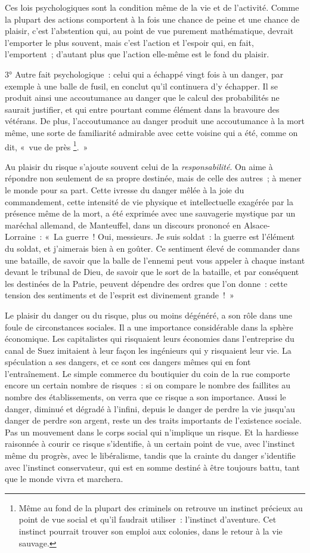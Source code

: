 \documentclass[french,twoside]{book} %
\begin{document}
Ces lois psychologiques sont la condition même de la vie et de l’activité. Comme la plupart des actions comportent à la fois une chance de peine et une chance de plaisir, c’est l’abstention qui, au point de vue purement mathématique, devrait l’emporter le plus souvent, mais c’est l’action et l’espoir qui, en fait, l’emportent ; d’autant plus que l’action elle-même est le fond du plaisir.\par
3° Autre fait psychologique : celui qui a échappé vingt fois à un danger, par exemple à une balle de fusil, en conclut qu’il continuera d’y échapper. Il se produit ainsi une accoutumance au danger que le calcul des probabilités ne saurait justifier, et qui entre pourtant comme élément dans la bravoure des vétérans. De plus, l’accoutumance au danger produit une accoutumance à la mort même, une sorte de familiarité admirable avec cette voisine qui a été, comme on dit, « vue de près \footnote{Même au fond de la plupart des criminels on retrouve un instinct précieux au point de vue social et qu’il faudrait utiliser : l’instinct d’aventure. Cet instinct pourrait trouver son emploi aux colonies, dans le retour à la vie sauvage.}. »\par
Au plaisir du risque s’ajoute souvent celui de la \emph{responsabilité}. On aime à répondre non seulement de sa propre destinée, mais de celle des autres ; à mener le monde pour sa part. Cette ivresse du danger mêlée à la joie du commandement, cette intensité de vie physique et intellectuelle exagérée par la présence même de la mort, a été exprimée avec une sauvagerie mystique par un maréchal allemand, de Manteuffel, dans un discours prononcé en Alsace-Lorraine : « La guerre ! Oui, messieurs. Je suis soldat : la guerre est l’élément du soldat, et j’aimerais bien à en goûter. Ce sentiment élevé de commander dans une bataille, de savoir que la balle de l’ennemi peut vous appeler à chaque instant devant le tribunal de Dieu, de savoir que le sort de la bataille, et par conséquent les destinées de la Patrie, peuvent dépendre des ordres que l’on donne : cette tension des sentiments et de l’esprit est divinement grande ! »\par
Le plaisir du danger ou du risque, plus ou moins dégénéré, a son rôle dans une foule de circonstances sociales. Il a une importance considérable dans la sphère économique. Les capitalistes qui risquaient leurs économies dans l’entreprise du canal de Suez imitaient à leur façon les ingénieurs qui y risquaient leur vie. La spéculation a ses dangers, et ce sont ces dangers mêmes qui en font l’entraînement. Le simple commerce du boutiquier du coin de la rue comporte encore un certain nombre de risques : si on compare le nombre des faillites au nombre des établissements, on verra que ce risque a son importance. Aussi le danger, diminué et dégradé à l’infini, depuis le danger de perdre la vie jusqu’au danger de perdre son argent, reste un des traits importants de l’existence sociale. Pas un mouvement dans le corps social qui n’implique un risque. Et la hardiesse raisonnée à courir ce risque s’identifie, à un certain point de vue, avec l’instinct même du progrès, avec le libéralisme, tandis que la crainte du danger s’identifie avec l’instinct conservateur, qui est en somme destiné à être toujours battu, tant que le monde vivra et marchera.\par
\end{document}
